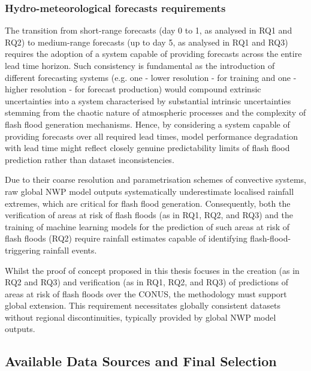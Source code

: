 \subsubsection{Hydro-meteorological forecasts requirements}

The  transition from short-range forecasts (day 0 to 1, as analysed in RQ1 and RQ2) to medium-range forecasts (up to day 5, as analysed in RQ1 and RQ3) requires the adoption of a system capable of providing forecasts across the entire lead time horizon. Such consistency is fundamental as the introduction of different forecasting systems (e.g. one - lower resolution - for training and one - higher resolution - for forecast production) would compound extrinsic uncertainties into a system characterised by substantial intrinsic uncertainties stemming from the chaotic nature of atmospheric processes and the complexity of flash flood generation mechanisms. Hence, by considering a system capable of providing forecasts over all required lead times, model performance degradation with lead time might reflect closely genuine predictability limits of flash flood prediction rather than dataset inconsistencies.

Due  to their coarse resolution and parametrisation schemes of convective systems, raw global NWP model outputs systematically underestimate localised rainfall extremes, which are critical for flash flood generation. Consequently, both the verification of areas at risk of flash floods (as in RQ1, RQ2, and RQ3) and the training of machine learning models for the prediction of such areas at risk of flash floods (RQ2) require rainfall estimates capable of identifying flash-flood-triggering rainfall events. 

Whilst  the proof of concept proposed in this thesis focuses in the creation (as in RQ2 and RQ3) and verification (as in RQ1, RQ2, and RQ3) of predictions of areas at risk of flash floods over the CONUS, the methodology must support global extension. This requirement necessitates globally consistent datasets without regional discontinuities, typically provided by global NWP model outputs.


\subsection{Available Data Sources and Final Selection}

